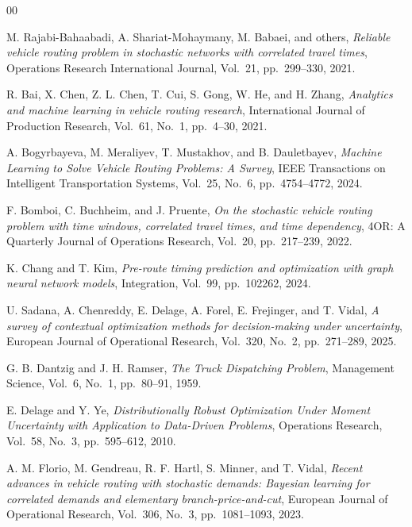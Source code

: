 \documentclass[preprint,12pt]{elsarticle}
\begin{document}
\begin{thebibliography}{00}

M. Rajabi-Bahaabadi, A. Shariat-Mohaymany, M. Babaei, and others,
\textit{Reliable vehicle routing problem in stochastic networks with correlated travel times},
Operations Research International Journal,
Vol.~21, pp.~299--330, 2021.

R. Bai, X. Chen, Z. L. Chen, T. Cui, S. Gong, W. He, and H. Zhang,
\textit{Analytics and machine learning in vehicle routing research},
International Journal of Production Research,
Vol.~61, No.~1, pp.~4--30, 2021.

A. Bogyrbayeva, M. Meraliyev, T. Mustakhov, and B. Dauletbayev,
\textit{Machine Learning to Solve Vehicle Routing Problems: A Survey},
IEEE Transactions on Intelligent Transportation Systems,
Vol.~25, No.~6, pp.~4754--4772, 2024.

F. Bomboi, C. Buchheim, and J. Pruente,
\textit{On the stochastic vehicle routing problem with time windows, correlated travel times, and time dependency},
4OR: A Quarterly Journal of Operations Research,
Vol.~20, pp.~217--239, 2022.

K. Chang and T. Kim,
\textit{Pre-route timing prediction and optimization with graph neural network models},
Integration,
Vol.~99, pp.~102262, 2024.

U. Sadana, A. Chenreddy, E. Delage, A. Forel, E. Frejinger, and T. Vidal,
\textit{A survey of contextual optimization methods for decision-making under uncertainty},
European Journal of Operational Research,
Vol.~320, No.~2, pp.~271--289, 2025.

G. B. Dantzig and J. H. Ramser,
\textit{The Truck Dispatching Problem},
Management Science,
Vol.~6, No.~1, pp.~80--91, 1959.

E. Delage and Y. Ye,
\textit{Distributionally Robust Optimization Under Moment Uncertainty with Application to Data-Driven Problems},
Operations Research,
Vol.~58, No.~3, pp.~595--612, 2010.

A. M. Florio, M. Gendreau, R. F. Hartl, S. Minner, and T. Vidal,
\textit{Recent advances in vehicle routing with stochastic demands: Bayesian learning for correlated demands and elementary branch-price-and-cut},
European Journal of Operational Research,
Vol.~306, No.~3, pp.~1081--1093, 2023.


\end{thebibliography}
\end{document}
